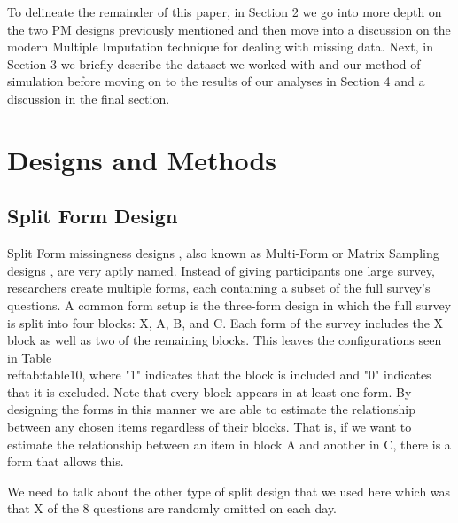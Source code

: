 \documentclass{svjour3}\usepackage[]{graphicx}\usepackage[]{color}
\begin{document}
To delineate the remainder of this paper, in Section 2 we go into more depth on the two PM designs previously mentioned and then move into a discussion on the modern Multiple Imputation technique for dealing with missing data. Next, in Section 3 we briefly describe the dataset we worked with and our method of simulation before moving on to the results of our analyses in Section 4 and a discussion in the final section. \par


\section{Designs and Methods}
\label{sec:1}
\subsection{Split Form Design}
\label{sec:1.1}

Split Form missingness designs \citep{raghunathan1995split}, also  known as Multi-Form \citep{little2013planned} or Matrix Sampling designs \citep{thomas2006evaluation}, are very aptly named. Instead of giving participants one large survey, researchers create multiple forms, each containing a subset of the full survey's questions. A common form setup is the three-form design \citep{graham1996maximizing} in which the full survey is split into four blocks: X, A, B, and C. Each form of the survey includes the X block as well as two of the remaining blocks. This leaves the configurations seen in Table \\ref{tab:table10}, where "1" indicates that the block is included and "0" indicates that it is excluded. Note that every block appears in at least one form. By designing the forms in this manner we are able to estimate the relationship between any chosen items regardless of their blocks. That is, if we want to estimate the relationship between an item in block A and another in C, there is a form that allows this. \par

We need to talk about the other type of split design that we used here which was that X of the 8 questions are randomly omitted on each day.  
\end{document}
